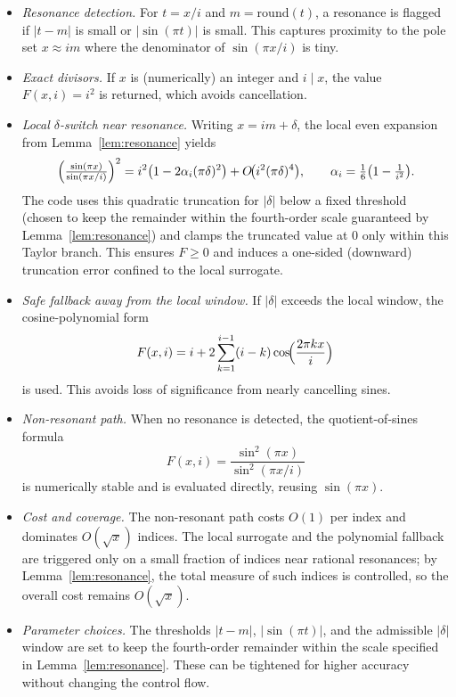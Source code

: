 \documentclass[11pt,a4paper]{amsart}
\theoremstyle{plain}
\theoremstyle{definition}
\theoremstyle{remark}
\begin{document}
\begin{itemize}
\item \emph{Resonance detection.} For $t=x/i$ and $m=\mathrm{round}(t)$, a resonance is flagged if $\lvert t-m\rvert$ is small or $\lvert\sin(\pi t)\rvert$ is small. This captures proximity to the pole set $x\approx im$ where the denominator of $\sin(\pi x/i)$ is tiny.

\item \emph{Exact divisors.} If $x$ is (numerically) an integer and $i\mid x$, the value $F(x,i)=i^2$ is returned, which avoids cancellation.

\item \emph{Local $\delta$-switch near resonance.} Writing $x=im+\delta$, the local even expansion from Lemma~\ref{lem:resonance} yields
\[
\Bigl(\tfrac{\sin(\pi x)}{\sin(\pi x/i)}\Bigr)^{2}
= i^{2}\bigl(1-2\alpha_i(\pi\delta)^{2}\bigr)+O\!\bigl(i^{2}(\pi\delta)^{4}\bigr),
\qquad \alpha_i=\tfrac16\bigl(1-\tfrac{1}{i^{2}}\bigr).
\]
The code uses this quadratic truncation for $\lvert\delta\rvert$ below a fixed threshold (chosen to keep the remainder within the fourth-order scale guaranteed by Lemma~\ref{lem:resonance}) and clamps the truncated value at $0$ only within this Taylor branch. This ensures $F\ge 0$ and induces a one-sided (downward) truncation error confined to the local surrogate.

\item \emph{Safe fallback away from the local window.} If $\lvert\delta\rvert$ exceeds the local window, the cosine-polynomial form
\[
F(x,i)=i+2\sum_{k=1}^{i-1}(i-k)\cos\!\Bigl(\frac{2\pi k x}{i}\Bigr)
\]
is used. This avoids loss of significance from nearly cancelling sines.

\item \emph{Non-resonant path.} When no resonance is detected, the quotient-of-sines formula
\[
F(x,i)=\frac{\sin^{2}(\pi x)}{\sin^{2}(\pi x/i)}
\]
is numerically stable and is evaluated directly, reusing $\sin(\pi x)$.

\item \emph{Cost and coverage.} The non-resonant path costs $O(1)$ per index and dominates $O(\sqrt{x})$ indices. The local surrogate and the polynomial fallback are triggered only on a small fraction of indices near rational resonances; by Lemma~\ref{lem:resonance}, the total measure of such indices is controlled, so the overall cost remains $O(\sqrt{x})$.

\item \emph{Parameter choices.} The thresholds $\lvert t-m\rvert$, $\lvert\sin(\pi t)\rvert$, and the admissible $\lvert\delta\rvert$ window are set to keep the fourth-order remainder within the scale specified in Lemma~\ref{lem:resonance}. These can be tightened for higher accuracy without changing the control flow.
\end{itemize}
\end{document}
